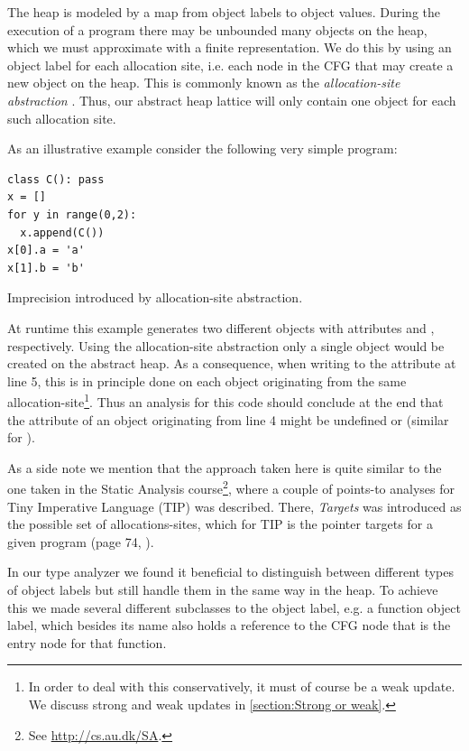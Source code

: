 The heap is modeled by a map from object labels to object values. During the execution of a program there may be unbounded many objects on the heap, which we must approximate with a finite representation. We do this by using an object label for each allocation site, i.e. each node in the CFG that may create a new object on the heap. This is commonly known as the \textit{allocation-site abstraction} \cite{recency,aopas} . Thus, our abstract heap lattice will only contain one object for each such allocation site.

As an illustrative example consider the following very simple program:

\begin{listing}[H]
	\begin{verbatim}
class C(): pass
x = []
for y in range(0,2):
  x.append(C())
x[0].a = 'a'
x[1].b = 'b'
	\end{verbatim}
	\caption{Imprecision introduced by allocation-site abstraction.}
\end{listing}

At runtime this example generates two different  objects with attributes  and , respectively. Using the allocation-site abstraction only a single  object would be created on the abstract heap. As a consequence, when writing to the attribute  at line 5, this is in principle done on each object originating from the same allocation-site\footnote{In order to deal with this conservatively, it must of course be a weak update. We discuss strong and weak updates in \autoref{section:Strong or weak}.}. Thus an analysis for this code should conclude at the end that the attribute  of an object originating from line 4 might be undefined or  (similar for ).

As a side note we mention that the approach taken here is quite similar to the one taken in the Static Analysis course\footnote{See \url{http://cs.au.dk/SA}.}, where a couple of points-to analyses for Tiny Imperative Language (TIP) was described. There, \textit{Targets} was introduced as the possible set of allocations-sites, which for TIP is the pointer targets  for a given program (page 74, \cite{sa}).

In our type analyzer we found it beneficial to distinguish between different types of object labels but still handle them in the same way in the heap. To achieve this we made several different subclasses to the object label, e.g. a function object label, which besides its name also holds a reference to the CFG node that is the entry node for that function.


